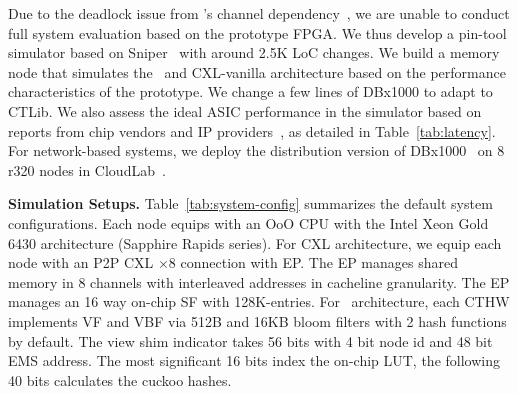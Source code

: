 {Due to the deadlock issue from \cxlcache's channel dependency~\cite{cxl-shortdoc, cxl-doc, cxl-paper}, we are unable to conduct full system evaluation based on the prototype FPGA. We thus develop a pin-tool simulator based on Sniper~\cite{sniper} with around 2.5K LoC changes. We build a memory node that simulates the \name~and CXL-vanilla architecture based on the performance characteristics of the prototype. We change a few lines of DBx1000 to adapt to CTLib. 
We also assess the ideal ASIC performance in the simulator based on reports from chip vendors and IP providers~\cite{samsung, directcxl, tpp_asplos23, hash-ip}, as detailed in Table~\ref{tab:latency}. 
For network-based systems, we deploy the distribution version of DBx1000~\cite{dbx1000_dist_vldb17, abyss_vldb14} on 8 r320 nodes in CloudLab~\cite{cloudlab}. 
}




\noindent \textbf{Simulation Setups. }
Table~\ref{tab:system-config} summarizes the default system configurations. Each node equips with an OoO CPU with the Intel Xeon Gold 6430 architecture (Sapphire Rapids series). For CXL architecture, we equip each node with an P2P CXL $\times$8 connection with EP. The EP manages shared memory in 8 channels with interleaved addresses in cacheline granularity. The EP manages an 16 way on-chip SF with 128K-entries. For \name~architecture, each CTHW implements VF and VBF via 512B and 16KB bloom filters with 2 hash functions by default. 
The view shim indicator takes 56 bits with 4 bit node id and 48 bit EMS address. The most significant 16 bits index the on-chip LUT, the following 40 bits calculates the cuckoo hashes. 

